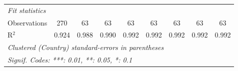\begin{table}[htbp]
\begin{tabular}{lcccccccc}
      \midrule \emph{Fit statistics}\\
      Observations                                                                     & 270     & 63      & 63             & 63             & 63             & 63             & 63             & 63\\  
      R$^2$                                                                            & 0.924   & 0.988   & 0.990          & 0.992          & 0.992          & 0.992          & 0.992          & 0.992\\  
      \midrule
      \multicolumn{9}{l}{\emph{Clustered (Country) standard-errors in parentheses}}\\
      \multicolumn{9}{l}{\emph{Signif. Codes: ***: 0.01, **: 0.05, *: 0.1}}\\
   \end{tabular}
\end{table}


